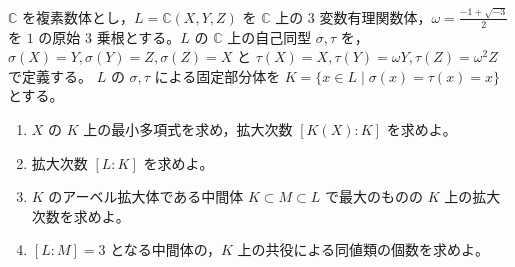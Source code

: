 \documentclass[12pt]{jlreq}
\begin{document}
$\mathbb{C}$ を複素数体とし，$L = \mathbb{C}(X,Y,Z)$ を $\mathbb{C}$ 上の $3$ 変数有理関数体，$\omega = \frac{-1 + \sqrt{-3}}{2}$ を $1$ の原始 $3$ 乗根とする。$L$ の $\mathbb{C}$ 上の自己同型 $\sigma, \tau$ を，$\sigma(X) = Y, \sigma(Y) = Z, \sigma(Z) = X$ と $\tau(X) = X, \tau(Y) = \omega Y, \tau(Z) = \omega^2 Z$ で定義する。
$L$ の $\sigma, \tau$ による固定部分体を $K = \{ x \in L \mid \sigma(x) = \tau(x) = x \}$ とする。

\begin{enumerate}
  \item $X$ の $K$ 上の最小多項式を求め，拡大次数 $[K(X): K]$ を求めよ。
  \item 拡大次数 $[L: K]$ を求めよ。
  \item $K$ のアーベル拡大体である中間体 $K \subset M \subset L$ で最大のものの $K$ 上の拡大次数を求めよ。
  \item $[L: M] = 3$ となる中間体の，$K$ 上の共役による同値類の個数を求めよ。
\end{enumerate}
\end{document}
